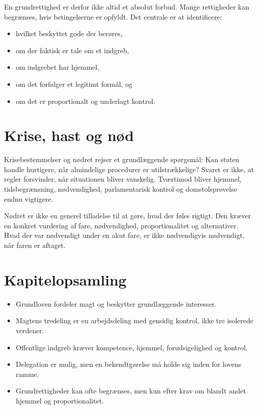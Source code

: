 En grundrettighed er derfor ikke altid et absolut forbud. Mange rettigheder kan begrænses, hvis betingelserne er opfyldt. Det centrale er at identificere:
\begin{itemize}
  \item hvilket beskyttet gode der berøres,
  \item om der faktisk er tale om et indgreb,
  \item om indgrebet har hjemmel,
  \item om det forfølger et legitimt formål, og
  \item om det er proportionalt og underlagt kontrol.
\end{itemize}

\section{Krise, hast og nød}

Krisebestemmelser og nødret rejser et grundlæggende spørgsmål: Kan staten handle hurtigere, når almindelige procedurer er utilstrækkelige? Svaret er ikke, at regler forsvinder, når situationen bliver vanskelig. Tværtimod bliver hjemmel, tidsbegrænsning, nødvendighed, parlamentarisk kontrol og domstolsprøvelse endnu vigtigere.

Nødret er ikke en generel tilladelse til at gøre, hvad der føles rigtigt. Den kræver en konkret vurdering af fare, nødvendighed, proportionalitet og alternativer. Hvad der var nødvendigt under en akut fare, er ikke nødvendigvis nødvendigt, når faren er aftaget.


\section*{Kapitelopsamling}
\begin{itemize}
  \item Grundloven fordeler magt og beskytter grundlæggende interesser.
  \item Magtens tredeling er en arbejdsdeling med gensidig kontrol, ikke tre isolerede verdener.
  \item Offentlige indgreb kræver kompetence, hjemmel, forudsigelighed og kontrol.
  \item Delegation er mulig, men en bekendtgørelse må holde sig inden for lovens ramme.
  \item Grundrettigheder kan ofte begrænses, men kun efter krav om blandt andet hjemmel og proportionalitet.
\end{itemize}

